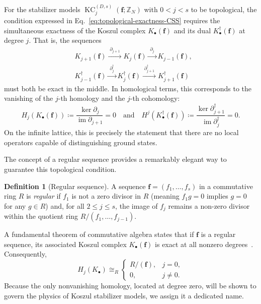 \documentclass[aps,prx,english,superscriptaddress,twocolumn,tightenlines,showpacs,longbibliography,floatfix,amsfonts]{revtex4-2}
\theoremstyle{remark}
\theoremstyle{definition}
\newtheorem{definition}{Definition}
\begin{document}
For the stabilizer models $\operatorname{KC}_j^{(D,s)}(\mathbf{f};\mathbb{Z}_N)$ with $0 < j < s$ to be topological, the condition expressed in Eq.~\eqref{eq:topological-exactness-CSS} requires the simultaneous exactness of the Koszul complex $K_\bullet(\mathbf{f})$ and its dual $K_\bullet^\dagger(\mathbf{f})$ at degree $j$. That is, the sequences
\begin{equation}
	\begin{split}
		&K_{j+1}(\mathbf{f})\xrightarrow{\;\partial_{j+1}\;}K_{j}(\mathbf{f})
		\xrightarrow{\;\partial_j\;}K_{j-1}(\mathbf{f}), \\
		&K_{j-1}^\dagger(\mathbf{f})\xrightarrow{\;\partial_j^\dagger\;}K_{j}^\dagger(\mathbf{f})
		\xrightarrow{\;\partial_{j+1}^\dagger\;}K_{j+1}^\dagger(\mathbf{f})
	\end{split}
	\label{eq:KC-topological-complexes}
\end{equation}
must both be exact in the middle. In homological terms, this corresponds to the vanishing of the $j$-th homology and the $j$-th cohomology:
\begin{equation}
	H_j(K_\bullet(\mathbf{f})) \coloneqq \frac{\ker \partial_j}{\operatorname{im}\partial_{j+1}} = 0
	\quad \text{and} \quad
	H^j(K_\bullet^\dagger(\mathbf{f})) \coloneqq \frac{\ker\partial_{j+1}^\dagger}{\operatorname{im} \partial_j^\dagger} = 0.
	\label{eq:KC-homology-cohomology}
\end{equation}
On the infinite lattice, this is precisely the statement that there are no local operators capable of distinguishing ground states.

The concept of a regular sequence provides a remarkably elegant way to guarantee this topological condition.

\begin{definition}[Regular sequence]
	\label{def:regular-sequence}
	A sequence $\mathbf{f}=(f_1,\dots,f_{s})$ in a commutative ring $R$ is \emph{regular} if $f_1$ is not a zero divisor in $R$ (meaning $f_1 g = 0$ implies $g = 0$ for any $g \in R$) and, for all $2\le j\le s$, the image of $f_j$ remains a non-zero divisor within the quotient ring $R/(f_1,\dots,f_{j-1})$.
\end{definition}

A fundamental theorem of commutative algebra states that if $\mathbf{f}$ is a regular sequence, its associated Koszul complex $K_\bullet(\mathbf{f})$ is exact at all nonzero degrees~\cite[Chap.~17]{eisenbud1995commutative}. Consequently,
\begin{equation}
	H_j(K_\bullet) \cong_R
	\begin{cases}
		R/(\mathbf{f}), & j = 0, \\
		0, & j \neq 0.
	\end{cases} \label{eq:koszul-homology}
\end{equation}
Because the only nonvanishing homology, located at degree zero, will be shown to govern the physics of Koszul stabilizer models, we assign it a dedicated name.
\end{document}
